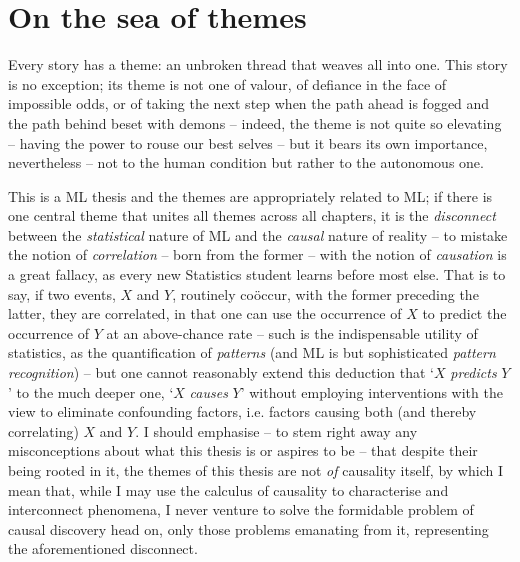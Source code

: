 \section*{On the sea of themes}\label{sec:themes}
Every story has a theme: an unbroken thread that weaves all into one.
%
This story is no exception; its theme is not one of valour, of defiance in the face of impossible
odds, or of taking the next step when the path ahead is fogged and the path behind beset with
demons -- indeed, the theme is not quite so elevating -- having the power to rouse our best selves
-- but it bears its own importance, nevertheless -- not to the human condition but rather to the
autonomous one.

%
%
This is a \acf{ML} thesis and the themes are appropriately related to \ac{ML}; if there is
one central theme that unites all themes across all chapters, it is the \emph{disconnect} between
the \emph{statistical} nature of \ac{ML} and the \emph{causal} nature of reality -- to mistake the
notion of \emph{correlation} -- born from the former -- with the notion of \emph{causation} is a
great fallacy, as every new Statistics student learns before most else.
%
That is to say, if two events, \(X\) and \(Y\), routinely co{\"o}ccur, with the former preceding
the latter, they are correlated, in that one can use the occurrence of \(X\) to predict the
occurrence of \(Y\) at an above-chance rate -- such is the indispensable utility of statistics, as
the quantification of \emph{patterns} (and \ac{ML} is but sophisticated \emph{pattern recognition})
-- but one cannot reasonably extend this deduction that `\(X\) \emph{predicts} \(Y\)' to the much
deeper one, `\(X\) \emph{causes} \(Y\)' without employing interventions with the view to eliminate
confounding factors, i.e. factors causing both (and thereby correlating) \(X\) and \(Y\).
%
I should emphasise -- to stem right away any misconceptions about what this thesis is or aspires to
be -- that despite their being rooted in it, the themes of this thesis are not \emph{of} causality
itself, by which I mean that, while I may use the calculus of causality to characterise and
interconnect phenomena, I never venture to solve the formidable problem of causal discovery head
on, only those problems emanating from it, representing the aforementioned disconnect.
%

